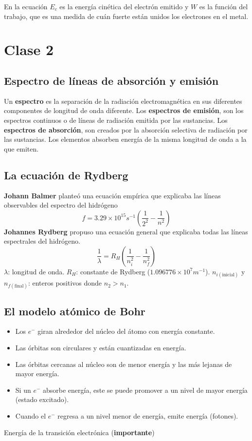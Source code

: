 \documentclass{article}
\begin{document}
En la ecuación $E_c$ es la energía cinética del electrón emitido y $W$ es la función del trabajo, que es una medida de cuán fuerte están unidos los electrones en el metal.

\section{Clase 2}

\subsection{Espectro de líneas de absorción y emisión}
Un \textbf{espectro} es la separación de la radiación electromagnética en sus diferentes componentes de longitud de onda diferente. Los \textbf{espectros de emisión}, son los espectros continuos o de líneas de radiación emitida por las sustancias. Los \textbf{espectros de absorción}, son creados por la absorción selectiva de radiación por las sustancias. 
Los elementos absorben energía de la misma longitud de onda a la que emiten.

\subsection{La ecuación de Rydberg}
\textbf{Johann Balmer} planteó una ecuación empírica que explicaba las líneas observables del espectro del hidrógeno
\begin{equation}
    f=3.29\times 10^{15}s^{-1}(\frac{1}{2^2}-\frac{1}{n^2})
\end{equation}
\textbf{Johannes Rydberg} propuso una ecuación general que explicaba todas las líneas espectrales del hidrógeno.
\begin{equation}
    \frac{1}{\lambda}=R_H(\frac{1}{n_{i}^{2}}-\frac{1}{n_{f}^{2}})
\end{equation}
$\lambda$: longitud de onda.
$R_H$: constante de Rydberg ($1.096776\times 10^7 m^{-1}$).
$n_{i(\text{inicial})}$ y $n_{f(\text{final})}$: enteros positivos donde $n_2>n_1$.

\subsection{El modelo atómico de Bohr}
\begin{itemize}
    \item Los $e^-$ giran alrededor del núcleo del átomo con energía constante.
    \item Las órbitas son circulares y están cuantizadas en energía.
    \item Las órbitas cercanas al núcleo son de menor energía y las más lejanas de mayor energía.
    \item Si un $e^-$ absorbe energía, este se puede promover a un nivel de mayor energía (estado excitado).
    \item Cuando el $e^-$ regresa a un nivel menor de energía, emite energía (fotones).
\end{itemize}
Energía de la transición electrónica (\textbf{importante})
\end{document}
